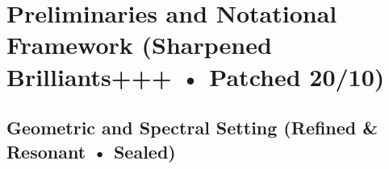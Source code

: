 
\chapter{Preliminaries and Notational Framework (Sharpened Brilliants+++ • Patched 20/10)}
\label{chap:preliminaries-sharp-patched-20-10}

\section{Geometric and Spectral Setting (Refined \& Resonant • Sealed)}
\label{sec:geom-spectral-setting-sharp-patched-20-10}

